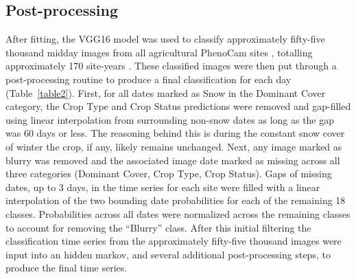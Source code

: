 \documentclass[remotesensing,article,submit,moreauthors,pdftex]{Definitions/mdpi}
\begin{document}
\subsection{Post-processing}

After fitting, the VGG16 model was used to classify approximately fifty-five thousand midday images from all agricultural PhenoCam sites , totalling approximately 170 site-years \citep{milliman2019-phenocam}. These classified images were then put through a post-processing routine to produce a final classification for each day (Table~\ref{table2}). First, for all dates marked as Snow in the Dominant Cover category, the Crop Type and Crop Status predictions were removed and gap-filled using linear interpolation from surrounding non-snow dates as long as the gap was 60 days or less. The reasoning behind this is during the constant snow cover of winter the crop, if any, likely remains unchanged. Next, any image marked as blurry was removed and the associated image date marked as missing across all three categories (Dominant Cover, Crop Type, Crop Status). Gaps of missing dates, up to 3 days, in the time series for each site were filled with a linear interpolation of the two bounding date probabilities for each of the remaining 18 classes. Probabilities across all dates were normalized across the remaining classes to account for removing the “Blurry” class. After this initial filtering the classification time series from the approximately fifty-five thousand images were input into an hidden markov, and several additional post-processing steps, to produce the final time series. 
\end{document}
